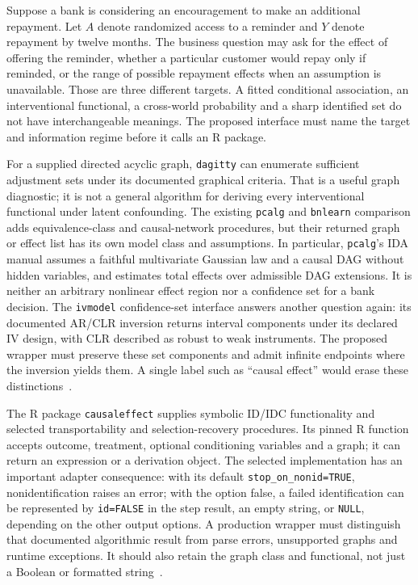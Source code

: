 Suppose a bank is considering an encouragement to make an additional repayment. Let $A$ denote randomized access to a reminder and $Y$ denote repayment by twelve months. The business question may ask for the effect of offering the reminder, whether a particular customer would repay only if reminded, or the range of possible repayment effects when an assumption is unavailable. Those are three different targets. A fitted conditional association, an interventional functional, a cross-world probability and a sharp identified set do not have interchangeable meanings. The proposed interface must name the target and information regime before it calls an R package.

For a supplied directed acyclic graph, \texttt{dagitty} can enumerate sufficient adjustment sets under its documented graphical criteria. That is a useful graph diagnostic; it is not a general algorithm for deriving every interventional functional under latent confounding. The existing \texttt{pcalg} and \texttt{bnlearn} comparison adds equivalence-class and causal-network procedures, but their returned graph or effect list has its own model class and assumptions. In particular, \texttt{pcalg}'s IDA manual assumes a faithful multivariate Gaussian law and a causal DAG without hidden variables, and estimates total effects over admissible DAG extensions. It is neither an arbitrary nonlinear effect region nor a confidence set for a bank decision. The \texttt{ivmodel} confidence-set interface answers another question again: its documented AR/CLR inversion returns interval components under its declared IV design, with CLR described as robust to weak instruments. The proposed wrapper must preserve these set components and admit infinite endpoints where the inversion yields them. A single label such as “causal effect” would erase these distinctions~\citep{exec13_other_dagitty,exec13_pcalg,exec13_bnlearn,v12_sw_ivmodel}.

The R package \texttt{causaleffect} supplies symbolic ID/IDC functionality and selected transportability and selection-recovery procedures. Its pinned R function accepts outcome, treatment, optional conditioning variables and a graph; it can return an expression or a derivation object. The selected implementation has an important adapter consequence: with its default \texttt{stop\_on\_nonid=TRUE}, nonidentification raises an error; with the option false, a failed identification can be represented by \texttt{id=FALSE} in the step result, an empty string, or \texttt{NULL}, depending on the other output options. A production wrapper must distinguish that documented algorithmic result from parse errors, unsupported graphs and runtime exceptions. It should also retain the graph class and functional, not just a Boolean or formatted string~\citep{exec18_rid_causaleffect}.

